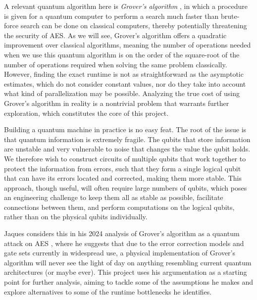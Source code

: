 A relevant quantum algorithm here is \emph{Grover's algorithm} \cite{dewolf2023quantumcomputinglecturenotes}, in which a procedure is given for a quantum computer to perform a search much faster than brute-force search can be done on classical computers, thereby potentially threatening the security of AES. 
As we will see, Grover's algorithm offers a quadratic improvement over classical algorithms, meaning the number of operations needed when we use this quantum algorithm is on the order of the square-root of the number of operations required when solving the same problem classically. However, finding the exact runtime is not as straightforward as the asymptotic estimates, which do not consider constant values, nor do they take into account what kind of parallelization may be possible. Analyzing the true cost of using Grover's algorithm in reality is a nontrivial problem that warrants further exploration, which constitutes the core of this project.

Building a quantum machine in practice is no easy feat. The root of the issue is that quantum information is extremely fragile. The qubits that store information are unstable and very vulnerable to noise that changes the value the qubit holds. We therefore wish to construct circuits of multiple qubits that work together to protect the information from errors, such that they form a single logical qubit that can have its errors located and corrected, making them more stable. This approach, though useful, will often require large numbers of qubits, which poses an engineering challenge to keep them all as stable as possible, facilitate connections between them, and perform computations on the logical qubits, rather than on the physical qubits individually.

Jaques considers this in his 2024 analysis of Grover's algorithm as a quantum attack on AES \cite{jaques2024ches_presentation}, where he suggests that due to the error correction models and gate sets currently in widespread use, a physical implementation of Grover's algorithm will never see the light of day on anything resembling current quantum architectures (or maybe ever). This project uses his argumentation as a starting point for further analysis, aiming to tackle some of the assumptions he makes and explore alternatives to some of the runtime bottlenecks he identifies.

